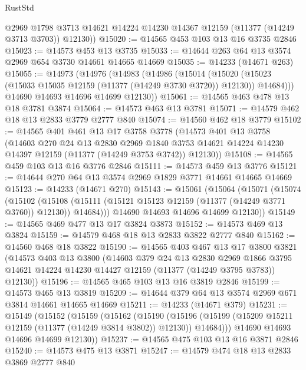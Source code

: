 \begin{lexlean}{RustStd}
\begin{coremodule}
        @2969
        @1798
        @3713
        @14621
        @14224
        @14230
        @14367
        @12159
        (@11377 (@14249 @3713 @3703))
        @12130))
@15020 := @14565 @453 @103 @13 @16 @3735 @2846
@15023 := @14573 @453 @13 @3735
@15033 := @14644 @263 @64 @13 @3574 @2969 @654 @3730 @14661 @14665 @14669
@15035 := @14233 (@14671 @263)
@15055 := @14973
    (@14976
      (@14983
        (@14986
          (@15014
            (@15020 (@15023 (@15033 @15035 @12159 (@11377 (@14249 @3730 @3720)) @12130)) @14684)))
        @14690
        @14693
        @14696
        @14699
        @12130))
@15061 := @14565 @463 @478 @13 @18 @3781 @3874
@15064 := @14573 @463 @13 @3781
@15071 := @14579 @462 @18 @13 @2833 @3779 @2777 @840
@15074 := @14560 @462 @18 @3779
@15102 := @14565
    @401
    @461
    @13
    @17
    @3758
    @3778
    (@14573
      @401
      @13
      @3758
      (@14603
        @270
        @24
        @13
        @2830
        @2969
        @1840
        @3753
        @14621
        @14224
        @14230
        @14397
        @12159
        (@11377 (@14249 @3753 @3742))
        @12130))
@15108 := @14565 @459 @103 @13 @16 @3776 @2846
@15111 := @14573 @459 @13 @3776
@15121 := @14644 @270 @64 @13 @3574 @2969 @1829 @3771 @14661 @14665 @14669
@15123 := @14233 (@14671 @270)
@15143 := @15061
    (@15064
      (@15071
        (@15074
          (@15102
            (@15108 (@15111 (@15121 @15123 @12159 (@11377 (@14249 @3771 @3760)) @12130)) @14684)))
        @14690
        @14693
        @14696
        @14699
        @12130))
@15149 := @14565 @469 @477 @13 @17 @3824 @3873
@15152 := @14573 @469 @13 @3824
@15159 := @14579 @468 @18 @13 @2833 @3822 @2777 @840
@15162 := @14560 @468 @18 @3822
@15190 := @14565
    @403
    @467
    @13
    @17
    @3800
    @3821
    (@14573
      @403
      @13
      @3800
      (@14603
        @379
        @24
        @13
        @2830
        @2969
        @1866
        @3795
        @14621
        @14224
        @14230
        @14427
        @12159
        (@11377 (@14249 @3795 @3783))
        @12130))
@15196 := @14565 @465 @103 @13 @16 @3819 @2846
@15199 := @14573 @465 @13 @3819
@15209 := @14644 @379 @64 @13 @3574 @2969 @671 @3814 @14661 @14665 @14669
@15211 := @14233 (@14671 @379)
@15231 := @15149
    (@15152
      (@15159
        (@15162
          (@15190
            (@15196 (@15199 (@15209 @15211 @12159 (@11377 (@14249 @3814 @3802)) @12130)) @14684)))
        @14690
        @14693
        @14696
        @14699
        @12130))
@15237 := @14565 @475 @103 @13 @16 @3871 @2846
@15240 := @14573 @475 @13 @3871
@15247 := @14579 @474 @18 @13 @2833 @3869 @2777 @840

\end{coremodule}
\end{lexlean}

